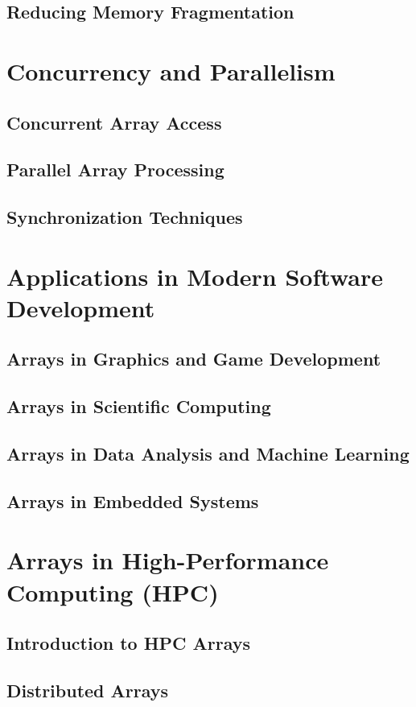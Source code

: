 \documentclass[12pt, oneside]{book}
\begin{document}
\section{Reducing Memory Fragmentation}

\chapter{Concurrency and Parallelism}
\section{Concurrent Array Access}
\section{Parallel Array Processing}
\section{Synchronization Techniques}

\chapter{Applications in Modern Software Development}
\section{Arrays in Graphics and Game Development}
\section{Arrays in Scientific Computing}
\section{Arrays in Data Analysis and Machine Learning}
\section{Arrays in Embedded Systems}

\chapter{Arrays in High-Performance Computing (HPC)}
\section{Introduction to HPC Arrays}
\section{Distributed Arrays}
\end{document}
